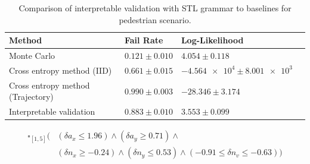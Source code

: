 \begin{table}
    \centering
    \caption{Comparison of interpretable validation with STL grammar to baselines for pedestrian scenario.}
    \label{tab:ped_results_stl}
    \begin{tabular}{@{}llll@{}} 
        \toprule
        \textbf{Method} & \textbf{Fail Rate} & \textbf{Log-Likelihood} \\
        \midrule
        Monte Carlo & $0.121 \pm 0.010$ & $4.054 \pm 0.118$  \\
        Cross entropy method (IID) & $0.661 \pm 0.015$ & $\num{-4.564e4} \pm \num{8.001e3}$\\
        Cross entropy method (Trajectory) & $0.990 \pm 0.003$ & $-28.346 \pm 3.174$ \\
        Interpretable validation & $0.883 \pm 0.010$ & $3.553 \pm 0.099$ \\
        \bottomrule
    \end{tabular}
\end{table}

\begin{equation}
\begin{split}
\square_{[1,5]}(&(\delta a_x \leq 1.96) \land (\delta a_y \geq 0.71) \land \\
&(\delta n_x \geq -0.24) \land (\delta n_y \leq 0.53) \land (-0.91 \leq \delta n_v \leq -0.63)) \label{eq:failure_description_pedstl}
\end{split}
\end{equation}

